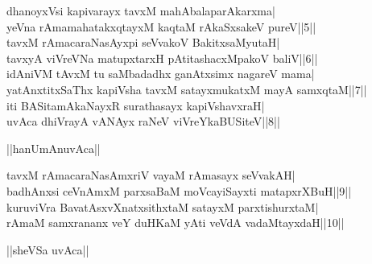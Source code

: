 \documentclass{article}
\begin{document}
dhanoyxVsi kapivarayx tavxM mahAbalaparAkarxma|\\
yeVna rAmamahatakxqtayxM kaqtaM rAkaSxsakeV pureV||5||\\
tavxM rAmacaraNasAyxpi seVvakoV BakitxsaMyutaH|\\
tavxyA viVreVNa matupxtarxH pAtitashacxMpakoV baliV||6||\\
idAniVM tAvxM tu saMbadadhx ganAtxsimx nagareV mama|\\
yatAnxtitxSaThx kapiVsha tavxM satayxmukatxM mayA samxqtaM||7||\\
iti BASitamAkaNayxR surathasayx kapiVshavxraH|\\
uvAca dhiVrayA vANAyx raNeV viVreYkaBUSiteV||8||\\

\begin{center}
||hanUmAnuvAca||
\end{center}

tavxM rAmacaraNasAmxriV vayaM rAmasayx seVvakAH|\\
badhAnxsi ceVnAmxM parxsaBaM moVcayiSayxti matapxrXBuH||9||\\
kuruviVra BavatAsxvXnatxsithxtaM satayxM parxtishurxtaM|\\
rAmaM samxrananx veY duHKaM yAti veVdA vadaMtayxdaH||10||\\

\begin{center}
||sheVSa uvAca||
\end{center}
\end{document}
